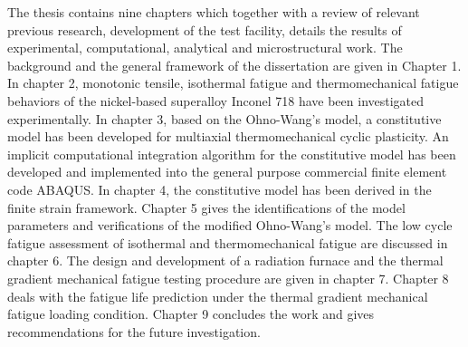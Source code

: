 The thesis contains nine chapters which together with a review of relevant previous research, development of the test facility, details the results of experimental, computational, analytical and microstructural work.
The background and the general framework of the dissertation are given in Chapter 1. 
In chapter 2, monotonic tensile, isothermal fatigue and thermomechanical fatigue behaviors of the nickel-based superalloy Inconel 718 have been investigated experimentally.
In chapter 3, based on the Ohno-Wang's model, a constitutive model has been developed for multiaxial thermomechanical cyclic plasticity. An implicit computational integration algorithm for the constitutive model has been developed and implemented into the general purpose commercial finite element code ABAQUS.
In chapter 4, the constitutive model has been derived in the finite strain framework.
Chapter 5 gives the identifications of the model parameters and verifications of the modified Ohno-Wang's model.
The low cycle fatigue assessment of isothermal and thermomechanical fatigue are discussed in chapter 6.
The design and development of a radiation furnace and the thermal gradient mechanical fatigue testing procedure are given in chapter 7.
Chapter 8 deals with the fatigue life prediction under the thermal gradient mechanical fatigue loading condition.
Chapter 9 concludes the work and gives recommendations for the future investigation.




